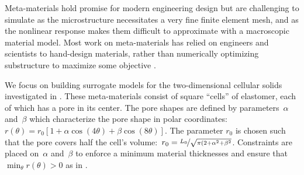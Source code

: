 Meta-materials hold promise for modern engineering design but are challenging to simulate as the microstructure necessitates a very fine finite element mesh, and as the nonlinear response makes them difficult to approximate with a macroscopic material model.
Most work on meta-materials has relied on engineers and scientists to hand-design materials, rather than numerically optimizing substructure to maximize some objective \citep{ion2016metamaterial}.

We focus on building surrogate models for the two-dimensional cellular solids investigated in \citet{overvelde2014relating}.
These meta-materials consist of square ``cells'' of elastomer, each of which has a pore in its center.
The pore shapes are defined by parameters~$\alpha$ and~$\beta$ which characterize the pore shape in polar coordinates:~${r(\theta) = r_0[1 + \alpha \cos(4\theta) + \beta \cos(8\theta)]}$.
The parameter $r_0$ is chosen such that the pore covers half the cell's volume:~${r_0 = \nicefrac{L_0}{\sqrt{\pi(2 + \alpha^2 + \beta^2}}}$. Constraints are placed on~$\alpha$ and~$\beta$ to enforce a minimum material thicknesses and ensure that $\min_\theta r(\theta) > 0$ as in \citet{overvelde2014relating}.

